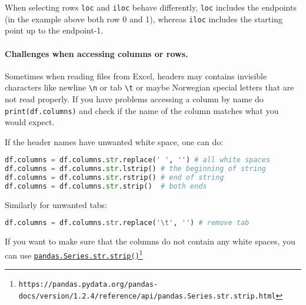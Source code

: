 \documentclass[graybox,sectrefs,envcountresetchap,open=right,final]{svmonodo}
\newenvironment{graybox2admon}[1][]{
\begin{graybox2mdframed}[frametitle=#1]
}
{
\end{graybox2mdframed}
}
\begin{document}
\begin{graybox2admon}[\texttt{pandas.DataFrame.loc} vs \texttt{pandas.DataFrame.iloc}]
When selecting rows \texttt{loc} and \texttt{iloc} behave differently, \texttt{loc} includes the endpoints (in the example above both row 0 and 1), whereas \texttt{iloc} includes the starting point up to the endpoint-1.
\end{graybox2admon}




\paragraph{Challenges when accessing columns or rows.}


\begin{graybox2admon}[Special characters]
Sometimes when reading files from Excel, headers may contains invisible characters like newline \Verb!\n! or tab \Verb!\t! or maybe Norwegian special letters that are not read properly. If you have problems accessing a column by name do \texttt{print(df.columns)} and check if the name of the column matches what you would expect.
\end{graybox2admon}




If the header names have unwanted white space, one can do:





\begin{lstlisting}[language=python,style=blue1bar]
df.columns = df.columns.str.replace(' ', '') # all white spaces
df.columns = df.columns.str.lstrip() # the beginning of string
df.columns = df.columns.str.rstrip() # end of string
df.columns = df.columns.str.strip()  # both ends

\end{lstlisting}

Similarly for unwanted tabs:


\begin{lstlisting}[language=python,style=blue1bar]
df.columns = df.columns.str.replace('\t', '') # remove tab

\end{lstlisting}

If you want to make sure that the columns do not contain any white spaces, you can use \href{{https://pandas.pydata.org/pandas-docs/version/1.2.4/reference/api/pandas.Series.str.strip.html}}{\nolinkurl{pandas.Series.str.strip()}\footnote{\texttt{https://pandas.pydata.org/pandas-docs/version/1.2.4/reference/api/pandas.Series.str.strip.html}}}
\end{document}
